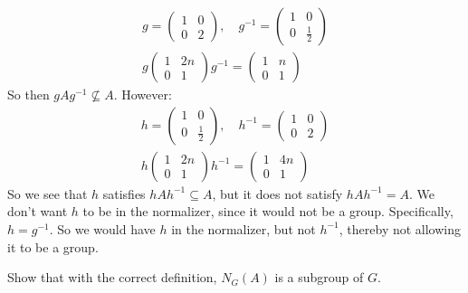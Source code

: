 \begin{gather*}
    g = \begin{pmatrix} 1 & 0 \\ 0 & 2 \end{pmatrix} , \quad
    g^{-1} = \begin{pmatrix} 1 & 0 \\ 0 & \frac{1}{2} \end{pmatrix} \\
    g\begin{pmatrix} 1 & 2n \\ 0 & 1 \end{pmatrix}g^{-1}
    = \begin{pmatrix} 1 & n \\ 0 & 1 \end{pmatrix}
\end{gather*}
So then $ gAg^{-1} \nsubseteq A $. However:
\begin{gather*}
    h = \begin{pmatrix} 1 & 0 \\ 0 & \frac{1}{2} \end{pmatrix} , \quad
    h^{-1} = \begin{pmatrix} 1 & 0 \\ 0 & 2 \end{pmatrix} \\
    h\begin{pmatrix} 1 & 2n \\ 0 & 1 \end{pmatrix}h^{-1}
    = \begin{pmatrix} 1 & 4n \\ 0 & 1 \end{pmatrix}
\end{gather*}
So we see that $ h $ satisfies $ hAh^{-1} \subseteq A $, but it does not satisfy $ hAh^{-1} = A $.
We don't want $ h $ to be in the normalizer, since it would not be a group.
Specifically, $ h = g^{-1} $. So we would have $ h $ in the normalizer, but not $ h^{-1} $,
thereby not allowing it to be a group.

\begin{exr}[source=Primary Source Material]
    Show that with the correct definition, $ N_{G}(A) $ is a subgroup of $ G $.
\end{exr}

